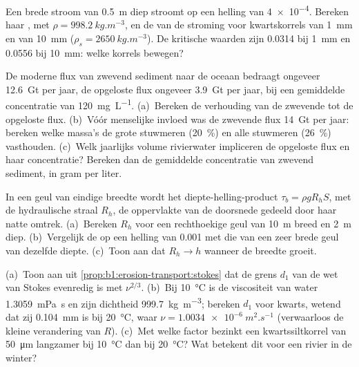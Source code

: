 \begin{exercise}[$\star$]\label{exo:b1:erosion-transport:3}
Een brede stroom van \qty{0.5}{m} diep stroomt op een helling van \num{4e-4}. Bereken haar , met $\rho = \qty{998.2}{kg.m^{-3}}$, en de  van de stroming voor kwartskorrels van \qty{1}{mm} en van \qty{10}{mm} ($\rho_s = \qty{2650}{kg.m^{-3}}$). De kritische waarden zijn \num{0.0314} bij \qty{1}{mm} en \num{0.0556} bij \qty{10}{mm}: welke korrels bewegen?
\end{exercise}

\begin{exercise}[$\star$]\label{exo:b1:erosion-transport:4}
De moderne flux van zwevend sediment naar de oceaan bedraagt ongeveer \qty{12.6}{Gt} per jaar, de opgeloste flux ongeveer \qty{3.9}{Gt} per jaar, bij een gemiddelde concentratie van \qty{120}{mg.L^{-1}}. (a)~Bereken de verhouding van de zwevende tot de opgeloste flux. (b)~Vóór menselijke invloed was de zwevende flux \qty{14}{Gt} per jaar: bereken welke massa's de grote stuwmeren (\qty{20}{\percent}) en alle stuwmeren (\qty{26}{\percent}) vasthouden. (c)~Welk jaarlijks volume rivierwater impliceren de opgeloste flux en haar concentratie? Bereken dan de gemiddelde concentratie van zwevend sediment, in gram per liter.
\end{exercise}

\begin{exercise}[$\star\star$]\label{exo:b1:erosion-transport:5}
In een geul van eindige breedte wordt het diepte-helling-product $\tau_b =
\rho g R_h S$, met de hydraulische straal $R_h$, de oppervlakte van de doorsnede gedeeld door haar natte omtrek. (a)~Bereken $R_h$ voor een rechthoekige geul van \qty{10}{m} breed en \qty{2}{m} diep. (b)~Vergelijk de  op een helling van \num{0.001} met die van een zeer brede geul van dezelfde diepte. (c)~Toon aan dat $R_h \to h$ wanneer de breedte groeit.
\end{exercise}

\begin{exercise}[$\star\star$]\label{exo:b1:erosion-transport:6}
(a)~Toon aan uit \cref{prop:b1:erosion-transport:stokes} dat de grens $d_1$ van de wet van Stokes evenredig is met $\nu^{2/3}$. (b)~Bij \qty{10}{\celsius} is de viscositeit van water \qty{1.3059}{mPa.s} en zijn dichtheid \qty{999.7}{kg.m^{-3}}; bereken $d_1$ voor kwarts, wetend dat zij \qty{0.104}{mm} is bij \qty{20}{\celsius}, waar $\nu = \qty{1.0034e-6}{m^2.s^{-1}}$ (verwaarloos de kleine verandering van $R$). (c)~Met welke factor bezinkt een kwartssiltkorrel van \qty{50}{\micro m} langzamer bij \qty{10}{\celsius} dan bij \qty{20}{\celsius}? Wat betekent dit voor een rivier in de winter?
\end{exercise}

